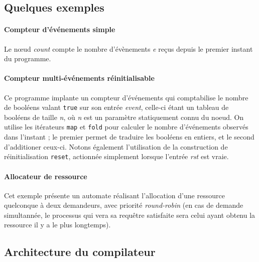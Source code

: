 \documentclass[a4paper]{article}
\begin{document}
\subsection{Quelques exemples}

\paragraph{Compteur d'\'ev\'enements simple}



Le nœud \textit{count} compte le nombre d'\'ev\`enements \textit{e} re\c{c}us depuis le
premier instant du programme.

\paragraph{Compteur multi-\'ev\'enements r\'einitialisable}



Ce programme implante un compteur d'\'ev\'enements qui comptabilise le nombre de
bool\'eens valant \texttt{true} sur son entr\'ee \textit{event}, celle-ci étant
un tableau de booléens de taille \textit{n}, où \textit{n} est un paramètre
statiquement connu du noeud. On utilise les it\'erateurs \texttt{map} et
\texttt{fold} pour calculer le nombre d'\'ev\'enements observ\'es dans l'instant
; le premier permet de traduire les bool\'eens en entiers, et le second
d'additioner ceux-ci. Notons \'egalement l'utilisation de la construction de
r\'einitialisation \texttt{reset}, actionn\'ee simplement lorsque l'entr\'ee
\textit{rst} est vraie.

\paragraph{Allocateur de ressource}



Cet exemple pr\'esente un automate r\'ealisant l'allocation d'une ressource
quelconque \`a deux demandeurs, avec priorit\'e \textit{round-robin} (en cas de
demande simultann\'ee, le processus qui vera sa requ\^etre satisfaite sera celui
ayant obtenu la ressource il y a le plus longtemps).

\subsection{Architecture du compilateur}
\end{document}

